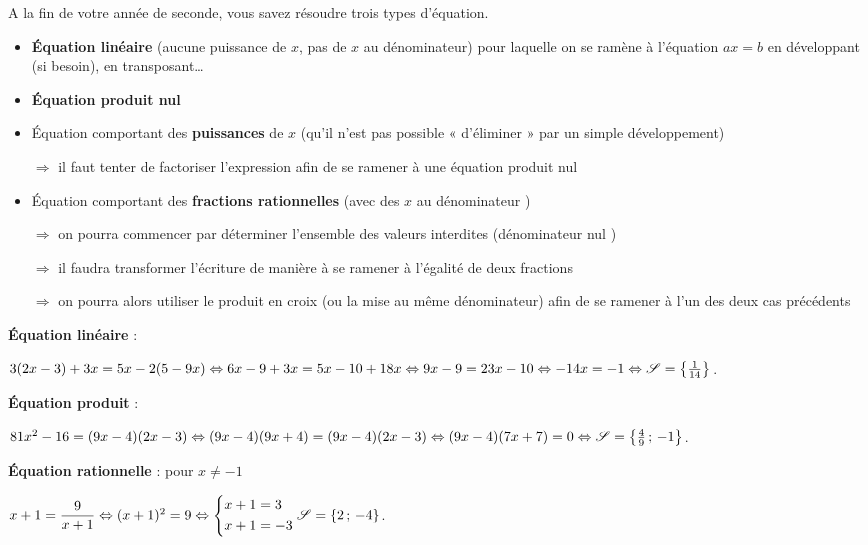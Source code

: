 \documentclass[a4paper,11pt]{article}
\begin{document}
\begin{cmethode}
A la fin de votre année de seconde, vous savez résoudre trois types d’équation.
\begin{itemize}[label=\small\faArrowCircleRight]
	\item \textbf{Équation linéaire} (aucune puissance de $x$, pas de $x$ au dénominateur) pour laquelle on se ramène à l’équation $ax = b$ en développant (si besoin), en transposant\ldots
	\item \textbf{Équation produit nul}
	\item Équation comportant des \textbf{puissances} de $x$ (qu’il n’est pas possible « d’éliminer » par un simple développement)
	
	$\Rightarrow$ il faut tenter de factoriser l’expression afin de se ramener à une équation produit nul
	\item Équation comportant des \textbf{fractions rationnelles} (\og avec des $x$ au dénominateur \fg)
	
	$\Rightarrow$ on pourra commencer par déterminer l’ensemble des valeurs interdites (\og dénominateur nul \fg)
	
	$\Rightarrow$ il faudra transformer l’écriture de manière à se ramener à l’égalité de deux fractions
	
	$\Rightarrow$ on pourra alors utiliser le produit en croix (ou la mise au même dénominateur) afin de se ramener à l’un des deux cas précédents
\end{itemize}
\end{cmethode}

\begin{cexemple}[s]
\textbf{Équation linéaire} :

\tabula{}$3(2x-3)+3x=5x-2(5-9x) \Leftrightarrow 6x-9+3x=5x-10+18x \Leftrightarrow 9x-9=23x-10 \Leftrightarrow -14x = -1 \Leftrightarrow \mathscr{S} = \left\lbrace \frac{1}{14} \right\rbrace$.

\textbf{Équation produit} :

\tabula{}$81x^2 - 16 = (9x - 4)(2x - 3) \Leftrightarrow (9x-4)(9x+4) = (9x - 4)(2x - 3) \Leftrightarrow  (9x-4)(7x+7)=0 \Leftrightarrow \mathscr{S} = \left\lbrace \frac{4}{9}\,;\,-1 \right\rbrace$.

\textbf{Équation rationnelle} : pour $x \neq -1$

\tabula{}$x+1 = \dfrac{9}{x+1} \Leftrightarrow (x+1)^2=9 \Leftrightarrow \begin{dcases} x+1=3 \\ x+1=-3 \end{dcases} \mathscr{S} = \left\lbrace 2\,;\,-4 \right\rbrace$.
\end{cexemple}
\end{document}
